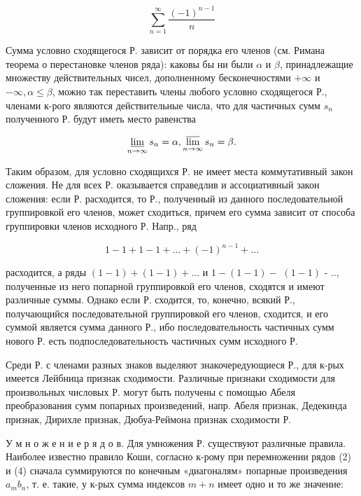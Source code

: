 \documentclass[10pt]{article}
\begin{document}
\[

\sum_{n=1}^{\infty} \frac{(-1)^{n-1}}{n}

\]



Сумма условно сходящегося Р. зависит от порядка его членов (см. Римана теорема о перестановке членов ряда): каковы бы ни были $\alpha$ и $\beta$, принадлежащие множеству действительных чисел, дополненному бесконечностями $+\infty$ и $-\infty, \alpha \leqslant \beta$, можно так переставить члены любого условно сходящегося Р., членами к-рого являются действительные числа, что для частичных сумм $s_{n}$ полученного Р. будут иметь место равенства



\[

\varliminf_{n \rightarrow \infty} s_{n}=\alpha, \varlimsup_{n \rightarrow \infty} s_{n}=\beta .

\]



Таким образом, для условно сходящихся Р. не имеет места коммутативный закон сложения. Не для всех Р. оказывается справедлив и ассоциативный закон сложения: если Р. расходится, то Р., полученный из данного последовательной группировкой его членов, может сходиться, причем его сумма зависит от способа группировки членов исходного Р. Напр., ряд



\[

1-1+1-1+\ldots+(-1)^{n-1}+\ldots

\]



расходится, а ряды $(1-1)+(1-1)+\ldots$ и $1-(1-1)-$ $(1-1)$ - .., полученные из него попарной группировкой его членов, сходятся и имеют различные суммы. Однако если Р. сходится, то, конечно, всякий Р., получающийся последовательной группировкой его членов, сходится, и его суммой является сумма данного Р., ибо последовательность частичных сумм нового Р. есть подпоследовательность частичных сумм исходного Р.



Среди Р. с членами разных знаков выделяют знакочередующиеся Р., для к-рых имеется Лейбница признак сходимости. Различные признаки сходимости для произвольных числовых Р. могут быть получены с помощью Абеля преобразования сумм попарных произведений, напр. Абеля признак, Дедекинда признак, Дирихле признак, Дюбуа-Реймона признак сходимости Р.



У м н о ж е н и е р я д о в. Для умножения Р. существуют различные правила. Наиболее известно правило Коши, согласно к-рому при перемножении рядов (2) и (4) сначала суммируются по конечным «диагоналям» попарные произведения $a_{m} b_{n}$, т. е. такие, у к-рых сумма индексов $m+n$ имеет одно и то же значение:
\end{document}
